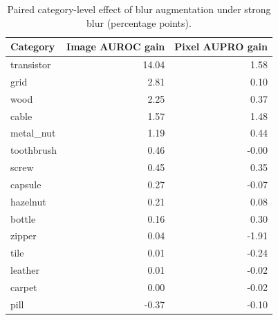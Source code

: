 \begin{table}[htbp]
\caption{Paired category-level effect of blur augmentation under strong blur (percentage points).}
\label{tab:strong_blur_categories}
\begin{tabular}{lrr}
\toprule
Category & Image AUROC gain & Pixel AUPRO gain \\
\midrule
transistor & 14.04 & 1.58 \\
grid & 2.81 & 0.10 \\
wood & 2.25 & 0.37 \\
cable & 1.57 & 1.48 \\
metal\_nut & 1.19 & 0.44 \\
toothbrush & 0.46 & -0.00 \\
screw & 0.45 & 0.35 \\
capsule & 0.27 & -0.07 \\
hazelnut & 0.21 & 0.08 \\
bottle & 0.16 & 0.30 \\
zipper & 0.04 & -1.91 \\
tile & 0.01 & -0.24 \\
leather & 0.01 & -0.02 \\
carpet & 0.00 & -0.02 \\
pill & -0.37 & -0.10 \\
\bottomrule
\end{tabular}
\end{table}
